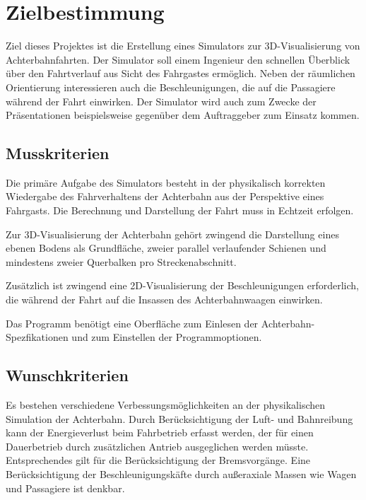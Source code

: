 
\chapter{Zielbestimmung}
Ziel dieses Projektes ist die Erstellung eines Simulators zur 3D-Visualisierung von Achterbahnfahrten. Der Simulator soll einem Ingenieur den schnellen Überblick über den Fahrtverlauf aus Sicht des Fahrgastes ermöglich. Neben der räumlichen Orientierung interessieren auch die Beschleunigungen, die auf die Passagiere während der Fahrt einwirken. Der Simulator wird auch zum Zwecke der Präsentationen beispielsweise gegenüber dem Auftraggeber zum Einsatz kommen.

\section{Musskriterien}
Die primäre Aufgabe des Simulators besteht in der physikalisch korrekten Wiedergabe des Fahrverhaltens der Achterbahn aus der Perspektive eines Fahrgasts. Die Berechnung und Darstellung der Fahrt muss in Echtzeit erfolgen.

Zur 3D-Visualisierung der Achterbahn gehört zwingend die Darstellung eines ebenen Bodens als Grundfläche, zweier parallel verlaufender Schienen und mindestens zweier Querbalken pro Streckenabschnitt.

Zusätzlich ist zwingend eine 2D-Visualisierung der Beschleunigungen erforderlich, die während der Fahrt auf die Insassen des Achterbahnwaagen einwirken.

Das Programm benötigt eine Oberfläche zum Einlesen der Achterbahn-Spezfikationen und zum Einstellen der Programmoptionen.

\section{Wunschkriterien}

Es bestehen verschiedene Verbessungsmöglichkeiten an der physikalischen Simulation der Achterbahn. Durch Berücksichtigung der Luft- und Bahnreibung kann der Energieverlust beim Fahrbetrieb erfasst werden, der für einen Dauerbetrieb durch zusätzlichen Antrieb ausgeglichen werden müsste. Entsprechendes gilt für die Berücksichtigung der Bremsvorgänge. Eine Berücksichtigung der Beschleunigungskäfte durch außeraxiale Massen wie Wagen und Passagiere ist denkbar.


